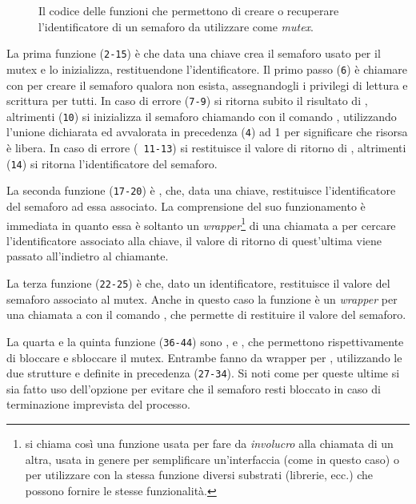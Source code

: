 \begin{figure}[!htbp]
  \footnotesize \centering
  \begin{minipage}[c]{\codesamplewidth}
  \end{minipage} 
  \normalsize 
  \caption{Il codice delle funzioni che permettono di creare o recuperare
    l'identificatore di un semaforo da utilizzare come \textit{mutex}.}
  \label{fig:ipc_mutex_create}
\end{figure}

La prima funzione (\texttt{\small 2-15}) è  che data una
chiave crea il semaforo usato per il mutex e lo inizializza, restituendone
l'identificatore. Il primo passo (\texttt{\small 6}) è chiamare 
con  per creare il semaforo qualora non esista,
assegnandogli i privilegi di lettura e scrittura per tutti. In caso di errore
(\texttt{\small 7-9}) si ritorna subito il risultato di ,
altrimenti (\texttt{\small 10}) si inizializza il semaforo chiamando
 con il comando , utilizzando l'unione
 dichiarata ed avvalorata in precedenza (\texttt{\small 4})
ad 1 per significare che risorsa è libera. In caso di errore (\texttt{\small
  11-13}) si restituisce il valore di ritorno di , altrimenti
(\texttt{\small 14}) si ritorna l'identificatore del semaforo.

La seconda funzione (\texttt{\small 17-20}) è , che, data una
chiave, restituisce l'identificatore del semaforo ad essa associato. La
comprensione del suo funzionamento è immediata in quanto essa è soltanto un
\textit{wrapper}\footnote{si chiama così una funzione usata per fare da
  \textsl{involucro} alla chiamata di un altra, usata in genere per
  semplificare un'interfaccia (come in questo caso) o per utilizzare con la
  stessa funzione diversi substrati (librerie, ecc.)  che possono fornire le
  stesse funzionalità.} di una chiamata a  per cercare
l'identificatore associato alla chiave, il valore di ritorno di quest'ultima
viene passato all'indietro al chiamante.

La terza funzione (\texttt{\small 22-25}) è  che, dato un
identificatore, restituisce il valore del semaforo associato al mutex. Anche
in questo caso la funzione è un \textit{wrapper} per una chiamata a
 con il comando , che permette di restituire il
valore del semaforo.

La quarta e la quinta funzione (\texttt{\small 36-44}) sono ,
e , che permettono rispettivamente di bloccare e sbloccare
il mutex. Entrambe fanno da wrapper per , utilizzando le due
strutture  e  definite in precedenza
(\texttt{\small 27-34}). Si noti come per queste ultime si sia fatto uso
dell'opzione  per evitare che il semaforo resti bloccato in
caso di terminazione imprevista del processo.

